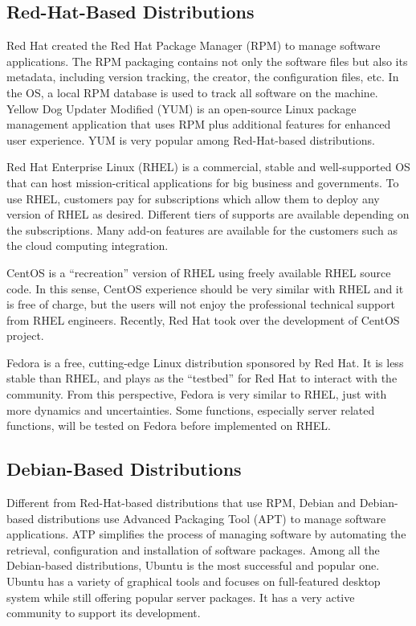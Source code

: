 \subsection{Red-Hat-Based Distributions}

Red Hat created the Red Hat Package Manager (RPM) to manage software applications. The RPM packaging contains not only the software files but also its metadata, including version tracking, the creator, the configuration files, etc. In the OS, a local RPM database is used to track all software on the machine. Yellow Dog Updater Modified (YUM) is an open-source Linux package management application that uses RPM plus additional features for enhanced user experience. YUM is very popular among Red-Hat-based distributions.

Red Hat Enterprise Linux (RHEL) is a commercial, stable and well-supported OS that can host mission-critical applications for big business and governments. To use RHEL, customers pay for subscriptions which allow them to deploy any version of RHEL as desired. Different tiers of supports are available depending on the subscriptions. Many add-on features are available for the customers such as the cloud computing integration.

CentOS is a ``recreation'' version of RHEL using freely available RHEL source code. In this sense, CentOS experience should be very similar with RHEL and it is free of charge, but the users will not enjoy the professional technical support from RHEL engineers. Recently, Red Hat took over the development of CentOS project.

Fedora is a free, cutting-edge Linux distribution sponsored by Red Hat. It is less stable than RHEL, and plays as the ``testbed'' for Red Hat to interact with the community. From this perspective, Fedora is very similar to RHEL, just with more dynamics and uncertainties. Some functions, especially server related functions, will be tested on Fedora before implemented on RHEL.

\subsection{Debian-Based Distributions}

Different from Red-Hat-based distributions that use RPM, Debian and Debian-based distributions use Advanced Packaging Tool (APT) to manage software applications. ATP simplifies the process of managing software by automating the retrieval, configuration and installation of software packages. Among all the Debian-based distributions, Ubuntu is the most successful and popular one. Ubuntu has a variety of graphical tools and focuses on full-featured desktop system while still offering popular server packages. It has a very active community to support its development.

